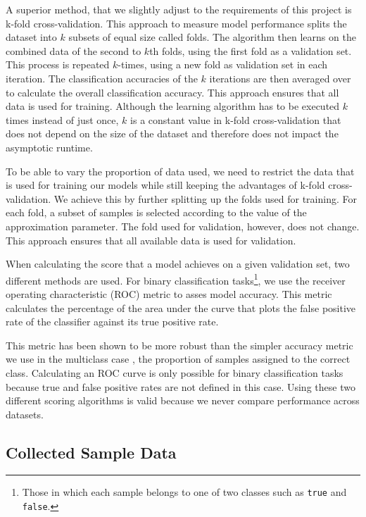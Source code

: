 \documentclass[a4paper,12pt,twoside,openright]{report}
\begin{document}
A superior method, that we slightly adjust to the requirements of this project is k-fold cross-validation. This approach to measure model performance splits the dataset into $k$ subsets of equal size called folds. The algorithm then learns on the combined data of the second to $k$th folds, using the first fold as a validation set. This process is repeated $k$-times, using a new fold as validation set in each iteration. The classification accuracies of the $k$ iterations are then averaged over to calculate the overall classification accuracy. This approach ensures that all data is used for training. Although the learning algorithm has to be executed $k$ times instead of just once, $k$ is a constant value in k-fold cross-validation that does not depend on the size of the dataset and therefore does not impact the asymptotic runtime.

To be able to vary the proportion of data used, we need to restrict the data that is used for training our models while still keeping the advantages of k-fold cross-validation. We achieve this by further splitting up the folds used for training. For each fold, a subset of samples is selected according to the value of the approximation parameter. The fold used for validation, however, does not change. This approach ensures that all available data is used for validation.

When calculating the score that a model achieves on a given validation set, two different methods are used. For binary classification tasks\footnote{Those in which each sample belongs to one of two classes such as \texttt{true} and \texttt{false}.}, we use the receiver operating characteristic (ROC) metric to asses model accuracy. This metric calculates the percentage of the area under the curve that plots the false positive rate of the classifier against its true positive rate. 

This metric has been shown to be more robust than the simpler accuracy metric we use in the multiclass case \cite{Bradley97theuse}, the proportion of samples assigned to the correct class. Calculating an ROC curve is only possible for binary classification tasks because true and false positive rates are not defined in this case. Using these two different scoring algorithms is valid because we never compare performance across datasets.





\subsection{Collected Sample Data}
\end{document}
